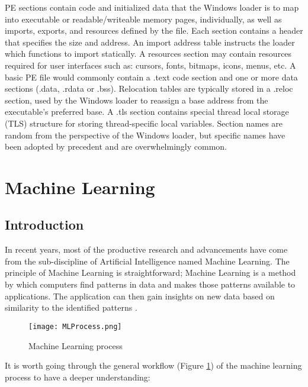 PE sections contain code and initialized data that the Windows loader is to map into executable or readable/writeable memory pages, individually, as well as imports, exports, and resources defined by the file. Each section contains a header that specifies the size and address. An import address table instructs the loader which functions to import statically. A resources section may contain resources required for user interfaces such as: cursors, fonts, bitmaps, icons, menus, etc. A basic PE file would commonly contain a .text code section and one or more data sections (.data, .rdata or .bss). Relocation tables are typically stored in a .reloc section, used by the Windows loader to reassign a base address from the executable’s preferred base. A .tls section contains special thread local storage (TLS) structure for storing thread-specific local variables. Section names are random from the perspective of the Windows loader, but specific names have been adopted by precedent and are overwhelmingly common.

\section{Machine Learning}

\subsection{Introduction}
\label{ssec:machine-learning-intro}

In recent years, most of the productive research and advancements have come from the sub-discipline of Artificial Intelligence named Machine Learning. The principle of Machine Learning is straightforward; Machine Learning is a method by which computers find patterns in data and makes those patterns available to applications. The application can then gain insights on new data based on similarity to the identified patterns \cite{martin2016machine}.

\begin{figure}[htbp!] 
\centering    
\texttt{[image: MLProcess.png]}
\caption{Machine Learning process \cite{martin2016machine}}
\label{fig:ml-process}
\end{figure}

It is worth going through the general workflow (Figure \ref{fig:ml-process}) of the machine learning process to have a deeper understanding:

